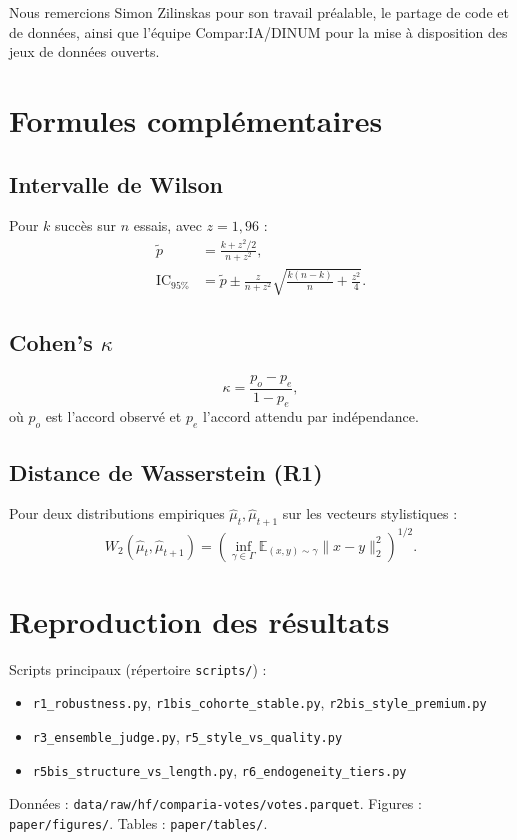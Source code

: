 \documentclass[11pt,a4paper]{article}
\begin{document}
Nous remercions Simon Zilinskas pour son travail préalable, le partage de code et
de données, ainsi que l'équipe Compar:IA/DINUM pour la mise à disposition des jeux
de données ouverts.




\appendix

\section{Formules complémentaires}
\label{app:formulas}

\subsection{Intervalle de Wilson}

Pour $k$ succès sur $n$ essais, avec $z = 1{,}96$ :
\begin{align}
  \tilde{p} &= \frac{k + z^2/2}{n + z^2}, \\
  \text{IC}_{95\%} &= \tilde{p} \pm \frac{z}{n + z^2}\sqrt{\frac{k(n-k)}{n} + \frac{z^2}{4}}.
\end{align}

\subsection{Cohen's $\kappa$}

\begin{equation}
  \kappa = \frac{p_o - p_e}{1 - p_e},
\end{equation}
où $p_o$ est l'accord observé et $p_e$ l'accord attendu par indépendance.

\subsection{Distance de Wasserstein (R1)}

Pour deux distributions empiriques $\hat{\mu}_t, \hat{\mu}_{t+1}$ sur les vecteurs
stylistiques :
\begin{equation}
  W_2(\hat{\mu}_t, \hat{\mu}_{t+1}) = \left(\inf_{\gamma \in \Gamma} \mathbb{E}_{(x,y)\sim\gamma}\|x-y\|_2^2\right)^{1/2}.
\end{equation}

\section{Reproduction des résultats}
\label{app:repro}

Scripts principaux (répertoire \texttt{scripts/}) :
\begin{itemize}[noitemsep]
  \item \texttt{r1\_robustness.py}, \texttt{r1bis\_cohorte\_stable.py}, \texttt{r2bis\_style\_premium.py}
  \item \texttt{r3\_ensemble\_judge.py}, \texttt{r5\_style\_vs\_quality.py}
  \item \texttt{r5bis\_structure\_vs\_length.py}, \texttt{r6\_endogeneity\_tiers.py}
\end{itemize}

Données : \texttt{data/raw/hf/comparia-votes/votes.parquet}.
Figures : \texttt{paper/figures/}. Tables : \texttt{paper/tables/}.
\end{document}
